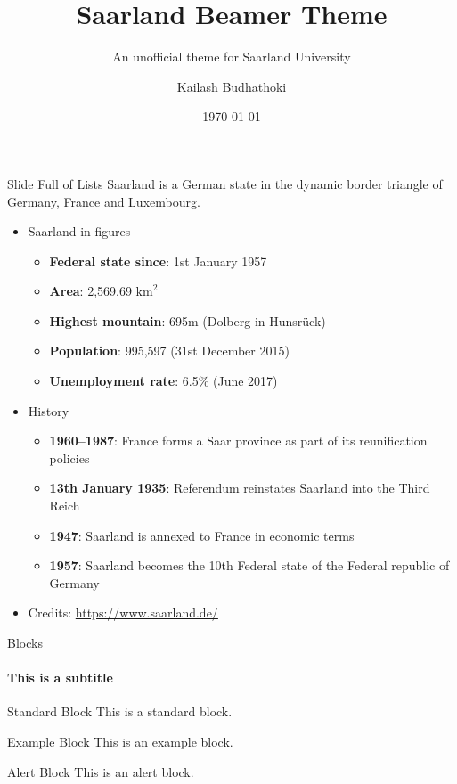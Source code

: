 \documentclass[aspectratio=43]{beamer}
\author{Kailash Budhathoki}
\title{Saarland Beamer Theme}
\subtitle{An unofficial theme for Saarland University}
\institute{Max Planck Institute for Informatics and Saarland University}
\date{\today}
\begin{document}
	\begin{frame}[plain]
		\titlepage
	\end{frame}
	
	\begin{frame}{Slide Full of Lists}
	Saarland is a German state in the dynamic border triangle of Germany, France and Luxembourg. 
		\begin{itemize}
			\item Saarland in figures
				\begin{itemize}
					\item \textbf{Federal state since}: 1st January 1957
					\item \textbf{Area}: 2,569.69 $\text{km}^2$
					\item \textbf{Highest mountain}: 695m (Dolberg in Hunsrück)
					\item \textbf{Population}: 995,597 (31st December 2015)
					\item \textbf{Unemployment rate}: 6.5\% (June 2017)
				\end{itemize}
			\item History
				\begin{itemize}
					\item \textbf{1960--1987}: France forms a Saar province as part of its reunification policies
					\item \textbf{13th January 1935}: Referendum reinstates Saarland into the Third Reich
					\item \textbf{1947}: Saarland is annexed to France in economic terms
					\item \textbf{1957}: Saarland becomes the 10th Federal state of the Federal republic of Germany
				\end{itemize}
			\item Credits: \url{https://www.saarland.de/}
		\end{itemize}
	\end{frame}

	\begin{frame}{Blocks}
		\framesubtitle{This is a subtitle}
		\begin{block}{Standard Block}
			This is a standard block.
		\end{block}
		
		\begin{exampleblock}{Example Block}
			This is an example block.
		\end{exampleblock}
		
		\begin{alertblock}{Alert Block}
			This is an alert block.
		\end{alertblock}
	\end{frame}
	
\end{document}
